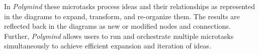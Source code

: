 In \textit{Polymind} these microtasks process ideas and their relationships as represented in the diagrams to expand, transform, and re-organize them.
The results are reflected back in the diagrams as new or modified nodes and connections. 
Further, \textit{Polymind} allows users to run and orchestrate multiple microtasks simultaneously to achieve efficient expansion and iteration of ideas.  



